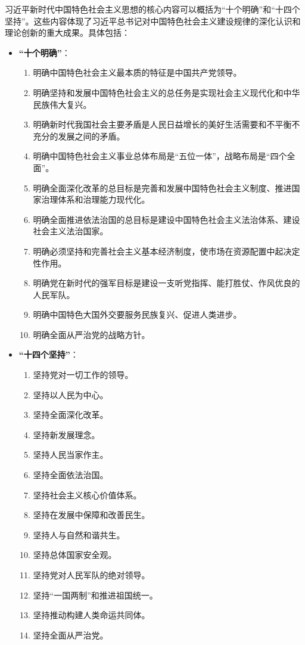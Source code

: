 \documentclass[
]{article}
\begin{document}
习近平新时代中国特色社会主义思想的核心内容可以概括为``十个明确''和``十四个坚持''。这些内容体现了习近平总书记对中国特色社会主义建设规律的深化认识和理论创新的重大成果。具体包括：

\begin{itemize}
\item
  \textbf{``十个明确''}：

  \begin{enumerate}
  \def\labelenumi{\arabic{enumi}.}
  \item
    明确中国特色社会主义最本质的特征是中国共产党领导。
  \item
    明确坚持和发展中国特色社会主义的总任务是实现社会主义现代化和中华民族伟大复兴。
  \item
    明确新时代我国社会主要矛盾是人民日益增长的美好生活需要和不平衡不充分的发展之间的矛盾。
  \item
    明确中国特色社会主义事业总体布局是``五位一体''，战略布局是``四个全面''。
  \item
    明确全面深化改革的总目标是完善和发展中国特色社会主义制度、推进国家治理体系和治理能力现代化。
  \item
    明确全面推进依法治国的总目标是建设中国特色社会主义法治体系、建设社会主义法治国家。
  \item
    明确必须坚持和完善社会主义基本经济制度，使市场在资源配置中起决定性作用。
  \item
    明确党在新时代的强军目标是建设一支听党指挥、能打胜仗、作风优良的人民军队。
  \item
    明确中国特色大国外交要服务民族复兴、促进人类进步。
  \item
    明确全面从严治党的战略方针。
  \end{enumerate}
\item
  \textbf{``十四个坚持''}：

  \begin{enumerate}
  \def\labelenumi{\arabic{enumi}.}
  \item
    坚持党对一切工作的领导。
  \item
    坚持以人民为中心。
  \item
    坚持全面深化改革。
  \item
    坚持新发展理念。
  \item
    坚持人民当家作主。
  \item
    坚持全面依法治国。
  \item
    坚持社会主义核心价值体系。
  \item
    坚持在发展中保障和改善民生。
  \item
    坚持人与自然和谐共生。
  \item
    坚持总体国家安全观。
  \item
    坚持党对人民军队的绝对领导。
  \item
    坚持``一国两制''和推进祖国统一。
  \item
    坚持推动构建人类命运共同体。
  \item
    坚持全面从严治党。
  \end{enumerate}
\end{itemize}
\end{document}
